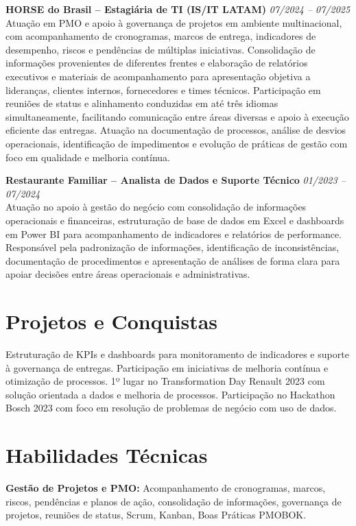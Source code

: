 \documentclass[11pt,a4paper]{article}
\newcommand{\experience}[3]{%
  \textbf{#1} \hfill \textit{#2}\\[4pt]
  #3
  \vspace{8pt}
}
\begin{document}
\experience{HORSE do Brasil -- Estagiária de TI (IS/IT LATAM)}{07/2024 -- 07/2025}{%
Atuação em PMO e apoio à governança de projetos em ambiente multinacional, com acompanhamento de cronogramas, marcos de entrega, indicadores de desempenho, riscos e pendências de múltiplas iniciativas. Consolidação de informações provenientes de diferentes frentes e elaboração de relatórios executivos e materiais de acompanhamento para apresentação objetiva a lideranças, clientes internos, fornecedores e times técnicos. Participação em reuniões de status e alinhamento conduzidas em até três idiomas simultaneamente, facilitando comunicação entre áreas diversas e apoio à execução eficiente das entregas. Atuação na documentação de processos, análise de desvios operacionais, identificação de impedimentos e evolução de práticas de gestão com foco em qualidade e melhoria contínua.}

\experience{Restaurante Familiar -- Analista de Dados e Suporte Técnico}{01/2023 -- 07/2024}{%
Atuação no apoio à gestão do negócio com consolidação de informações operacionais e financeiras, estruturação de base de dados em Excel e dashboards em Power BI para acompanhamento de indicadores e relatórios de performance. Responsável pela padronização de informações, identificação de inconsistências, documentação de procedimentos e apresentação de análises de forma clara para apoiar decisões entre áreas operacionais e administrativas.}

\section*{Projetos e Conquistas}

Estruturação de KPIs e dashboards para monitoramento de indicadores e suporte à governança de entregas. Participação em iniciativas de melhoria contínua e otimização de processos. 1º lugar no Transformation Day Renault 2023 com solução orientada a dados e melhoria de processos. Participação no Hackathon Bosch 2023 com foco em resolução de problemas de negócio com uso de dados.

\section*{Habilidades Técnicas}

\textbf{Gestão de Projetos e PMO:} Acompanhamento de cronogramas, marcos, riscos, pendências e planos de ação, consolidação de informações, governança de projetos, reuniões de status, Scrum, Kanban, Boas Práticas PMOBOK.
\end{document}
